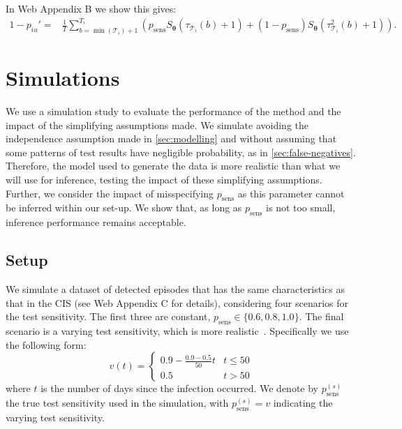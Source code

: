 \documentclass[referee,useAMS,usenatbib]{biom}
\renewcommand{\vec}[1]{\bm{#1}}
\newcommand{\psens}{p_\text{sens}}
\newcommand{\psenss}{p_\text{sens}^{(s)}}
\newcommand{\sched}{\mathcal{T}}
\begin{document}
In Web Appendix B we show this gives:
\begin{align}
1 - p_{iu}'
=& \frac{1}{T} \sum_{b=\min(\sched_{i}) + 1}^{T_{i}} \left( p_\text{sens} S_{\vec{\theta}}(\tau_{\sched_{i}}(b) + 1) + (1 - p_\text{sens}) S_{\vec{\theta}}(\tau^2_{\sched_{i}}(b) + 1)\right).
\label{imperf-test:eq:pit-prime}
\end{align}

\section{Simulations} \label{sec:simulation}


We use a simulation study to evaluate the performance of the method and the impact of the simplifying assumptions made.
We simulate avoiding the independence assumption made in \cref{sec:modelling} and without assuming that some patterns of test results have negligible probability, as in \cref{sec:false-negatives}.
Therefore, the model used to generate the data is more realistic than what we will use for inference, testing the impact of these simplifying assumptions.
Further, we consider the impact of misspecifying $\psens$ as this parameter cannot be inferred within our set-up.
We show that, as long as $\psens$ is not too small, inference performance remains acceptable.

\subsection{Setup}

We simulate a dataset of detected episodes that has the same characteristics as that in the CIS (see Web Appendix C for details), considering four scenarios for the test sensitivity.
The first three are constant, $\psens \in \{ 0.6, 0.8, 1.0 \}$.
The final scenario is a varying test sensitivity, which is more realistic~\citep{blakeThesis}.
Specifically we use the following form:
\begin{equation}
  v(t) = \begin{cases}
    0.9 - \frac{0.9-0.5}{50}t &t \leq 50 \\
    0.5 &t > 50
  \end{cases}
  \label{imperf-test:eq:variable-test-sensitivity}
\end{equation}
where $t$ is the number of days since the infection occurred.
We denote by $\psenss$ the true test sensitivity used in the simulation, with $\psenss = v$ indicating the varying test sensitivity.
\end{document}
